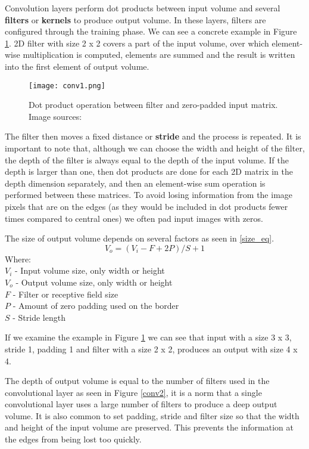Convolution layers perform dot products between input volume and several \textbf{filters} or \textbf{kernels} to produce output volume.
In these layers, filters are configured through the training phase.
We can see a concrete example in Figure \ref{conv1}.
2D filter with size 2 x 2 covers a part of the input volume, over which element-wise multiplication is computed, elements are summed and the result is written into the first element of output volume.

\begin{figure}[ht] 
    \centering
    \texttt{[image: conv1.png]} 
\caption[Dot product operation between filter and zero-padded input matrix.] {Dot product operation between filter and zero-padded input matrix. Image sources: \cite{conv_layer_img}}
    \label{conv1}
\end{figure}

The filter then moves a fixed distance or \textbf{stride} and the process is repeated.
It is important to note that, although we can choose the width and height of the filter, the depth of the filter is always equal to the depth of the input volume.
If the depth is larger than one, then dot products are done for each 2D matrix in the depth dimension separately, and then an element-wise sum operation is performed between these matrices.
To avoid losing information from the image pixels that are on the edges (as they would be included in dot products fewer times compared to central ones) we often pad input images with zeros.

The size of output volume depends on several factors as seen in \ref{size_eq}.
\begin{equation}\label{size_eq}
V_{o} = (V_{i} - F + 2P) / S + 1
\end{equation}
Where:\\
$V_{i}$ - Input volume size, only width or height\\
$V_{o}$ - Output volume size, only width or height\\
$F$ - Filter or receptive field size\\
$P$ - Amount of zero padding used on the border\\
$S$ - Stride length

If we examine the example in Figure \ref{conv1} we can see that input with a size 3 x 3, stride 1, padding 1 and filter with a size 2 x 2, produces an output with size 4 x 4.

The depth of output volume is equal to the number of filters used in the convolutional layer as seen in Figure \ref{conv2}, it is a norm that a single convolutional layer uses a large number of filters to produce a deep output volume\cite{cs231n}.
It is also common to set padding, stride and filter size so that the width and height of the input volume are preserved.
This prevents the information at the edges from being lost too quickly\cite{cs231n}.


